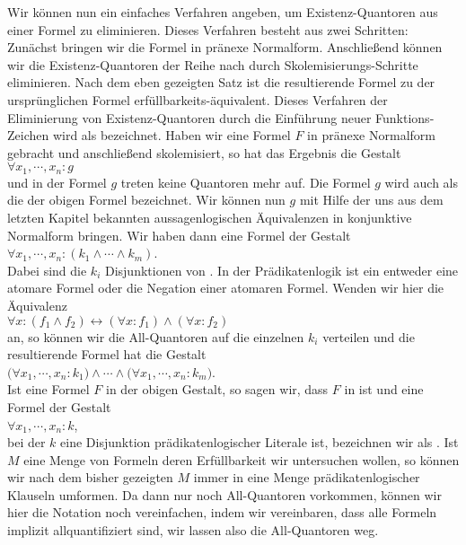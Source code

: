 Wir können nun ein einfaches Verfahren angeben, um Existenz-Quantoren aus einer Formel
zu eliminieren.  Dieses Verfahren besteht aus zwei Schritten:  Zunächst bringen wir die Formel
in pränexe Normalform. Anschließend können wir die Existenz-Quantoren der Reihe nach durch 
Skolemisierungs-Schritte eliminieren.  Nach dem eben gezeigten Satz ist die resultierende 
Formel zu der ursprünglichen Formel erfüllbarkeits-äquivalent.  Dieses
Verfahren der Eliminierung von Existenz-Quantoren durch die Einführung neuer
Funktions-Zeichen wird als  bezeichnet.  Haben wir eine Formel $F$
in pränexe Normalform gebracht und anschließend skolemisiert, so hat das Ergebnis die Gestalt\\[0.2cm]
\hspace*{1.3cm} $\forall x_1, \cdots, x_n: g$ \\[0.2cm]
und in der Formel $g$ treten keine Quantoren mehr auf.  Die Formel $g$ wird auch als die
 der obigen Formel bezeichnet.  Wir können nun  $g$ mit Hilfe
der uns aus dem letzten Kapitel bekannten aussagenlogischen
 Äquivalenzen in konjunktive Normalform bringen.  Wir haben dann eine
Formel der Gestalt \\[0.2cm]
\hspace*{1.3cm} $\forall x_1, \cdots, x_n: (k_1 \wedge \cdots \wedge k_m)$. \\[0.2cm]
Dabei sind die $k_i$ Disjunktionen von .  In der Prädikatenlogik ist ein
 entweder eine atomare Formel oder die Negation einer atomaren Formel.  Wenden wir
hier  die Äquivalenz 
\\[0.2cm]
\hspace*{1.3cm}
$\forall x\colon (f_1\wedge f_2) \leftrightarrow (\forall x\colon f_1) \wedge (\forall x\colon f_2)$
\\[0.2cm]
an, so können wir die All-Quantoren auf die einzelnen $k_i$ verteilen und
die resultierende Formel hat die Gestalt \\[0.2cm]
\hspace*{1.3cm} 
$\big(\forall x_1, \cdots, x_n: k_1\big) \wedge \cdots \wedge \big(\forall x_1, \cdots, x_n: k_m\big)$. \\[0.2cm]
Ist eine Formel $F$ in der obigen
Gestalt, so sagen wir, dass $F$ in  ist und eine
Formel der Gestalt \\[0.2cm]
\hspace*{1.3cm} $\forall x_1, \cdots, x_n: k$, \\[0.2cm]
bei der $k$ eine Disjunktion prädikatenlogischer Literale ist,
bezeichnen wir als .  Ist $M$
eine Menge von Formeln deren Erfüllbarkeit wir untersuchen wollen, so können wir nach dem
bisher gezeigten $M$ immer in eine Menge prädikatenlogischer Klauseln umformen.
Da  dann nur noch All-Quantoren vorkommen, können wir hier die  Notation noch vereinfachen,
indem wir vereinbaren, dass alle Formeln implizit allquantifiziert sind, wir lassen also
die All-Quantoren weg.

